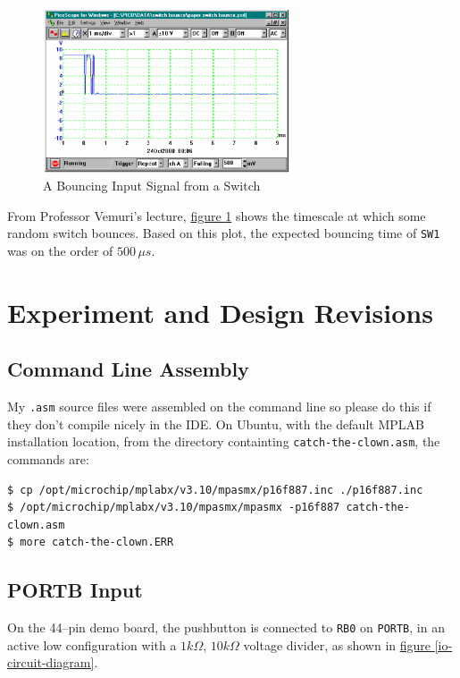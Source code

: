 \documentclass[11pt]{article}
\begin{document}
\begin{figure}
	\centering
	\includegraphics[width=0.65\textwidth]{Figures/debounce-handout-time-graph.pdf}
	\caption{A Bouncing Input Signal from a Switch}
	\label{debounce-handout-time-graph}
\end{figure}

From Professor Vemuri's lecture,
\hyperref[debounce-handout-time-graph]{figure \ref{debounce-handout-time-graph}}
shows the timescale at which some random switch bounces.
Based on this plot, the expected bouncing time of \texttt{SW1}
was on the order of $500\, \mu s$.

\section{Experiment and Design Revisions}

\subsection{Command Line Assembly}

My \texttt{.asm} source files were assembled on the command line so
please do this if they don't compile nicely in the IDE.
On Ubuntu, with the default MPLAB installation location, 
from the directory containting \texttt{catch-the-clown.asm}, the commands are:
\begin{verbatim}
$ cp /opt/microchip/mplabx/v3.10/mpasmx/p16f887.inc ./p16f887.inc
$ /opt/microchip/mplabx/v3.10/mpasmx/mpasmx -p16f887 catch-the-clown.asm
$ more catch-the-clown.ERR
\end{verbatim}

\subsection{PORTB Input}

On the 44--pin demo board, the pushbutton is connected to \texttt{RB0}
on \texttt{PORTB}, in an active low configuration with a $1k\Omega$, $10k\Omega$
voltage divider, as shown in \hyperref[io-circuit-diagram]{figure \ref{io-circuit-diagram}}.
\end{document}

